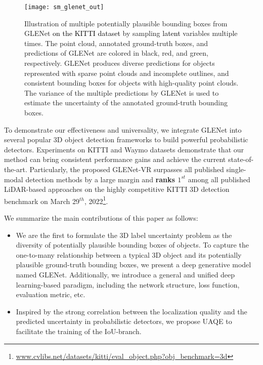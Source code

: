\documentclass[twocolumn]{svjour3}
\newcommand{\revise}[1]{\textcolor{black}{#1}}
\begin{document}
\begin{figure*}[htp]
\centering
\texttt{[image: sm\_glenet\_out]}
\caption{Illustration of multiple potentially plausible bounding boxes from GLENet \revise{on the KITTI dataset} by sampling \revise{latent} variables multiple times. The point cloud, annotated ground-truth boxes, and predictions of GLENet are colored in black, red, and green, respectively. GLENet produces diverse predictions for objects represented with sparse point clouds and incomplete outlines, and consistent bounding boxes for objects with high-quality point clouds. The variance of the multiple predictions by GLENet is used to estimate the uncertainty of the annotated ground-truth bounding boxes.}
\label{fig:plenet_out}
\end{figure*}


To demonstrate our effectiveness and universality, we integrate GLENet into several popular 3D object detection frameworks to build powerful probabilistic detectors. Experiments on KITTI \citep{Geiger_KITTI} and Waymo \citep{Sun_2020_CVPR} datasets demonstrate that our method can bring consistent performance gains and achieve the current state-of-the-art. Particularly, the proposed GLENet-VR surpasses all published single-modal detection methods by a large margin and \textbf{ranks $1^{st}$} among all published LiDAR-based approaches on the highly competitive KITTI 3D detection benchmark on March 29$^{th}$, 2022\footnote{
\href{www.cvlibs.net/datasets/kitti/eval_object.php?obj_benchmark=3d}{www.cvlibs.net/datasets/kitti/eval\_object.php?obj\_benchmark=3d}
}. 

We summarize the main contributions of this paper as follows:

\begin{itemize}
\item We are the first to formulate the 3D label uncertainty problem as the diversity of potentially plausible bounding boxes of objects. To capture the one-to-many relationship between a typical 3D object and its potentially plausible ground-truth bounding boxes, we present a deep generative model named GLENet. Additionally, we introduce a general and unified deep learning-based paradigm, including the network structure, loss function, evaluation metric, etc.
\item Inspired by the strong correlation between the localization quality and the predicted uncertainty in probabilistic detectors, we propose UAQE to facilitate the training of the IoU-branch.
\end{itemize}
\end{document}
